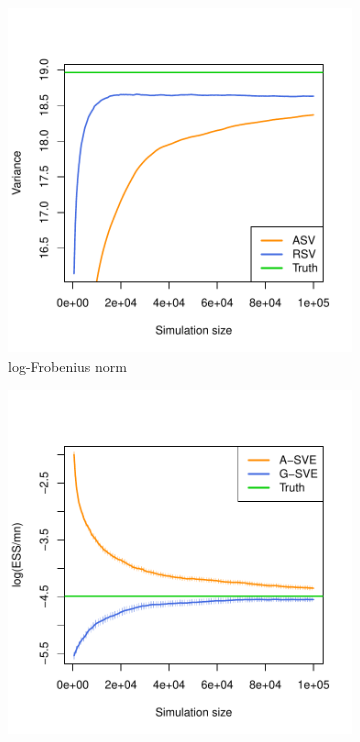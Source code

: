 \documentclass[11pt]{article}
\theoremstyle{remark}
\begin{document}
\begin{figure}[htbp]
    \centering
    \begin{subfigure}{0.4\textwidth}
      \centering
      \includegraphics[width = \textwidth]{plots/var-frob.pdf}
      \caption{log-Frobenius norm}
      \label{subfig:var-frob}
    \end{subfigure}
    \begin{subfigure}{0.4\textwidth}
      \centering
      \includegraphics[width = \textwidth]{plots/var-ess.pdf}

\end{subfigure}
\end{figure}
\end{document}
